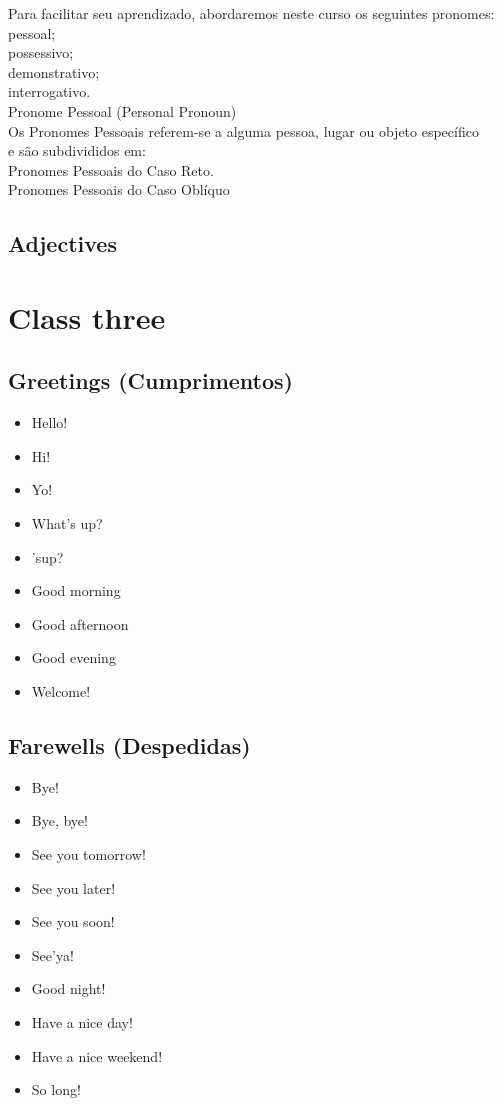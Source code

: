 \documentclass[12pt,a4paper]{article} %
\begin{document}
Para facilitar seu aprendizado, abordaremos neste curso os seguintes pronomes:\\
pessoal;\\
possessivo;\\
demonstrativo;\\
interrogativo.\\
Pronome Pessoal (Personal Pronoun)\\
Os Pronomes Pessoais referem-se a alguma pessoa, lugar ou objeto específico\\
e são subdivididos em:\\
Pronomes Pessoais do Caso Reto.\\
Pronomes Pessoais do Caso Oblíquo\\
\subsection{Adjectives}


\section{Class three}
\subsection{Greetings (Cumprimentos)}
\begin{itemize}
\item Hello!
\item Hi!
\item Yo!
\item What's up?
\item 'sup?
\item Good morning
\item Good afternoon
\item Good evening
\item Welcome!
\end{itemize}
\subsection{Farewells (Despedidas)}
\begin{itemize}
\item Bye!
\item Bye, bye!
\item See you tomorrow!
\item See you later!
\item See you soon!
\item See'ya!
\item Good night!
\item Have a nice day!
\item Have a nice weekend!
\item So long!
\end{itemize}
\end{document}
